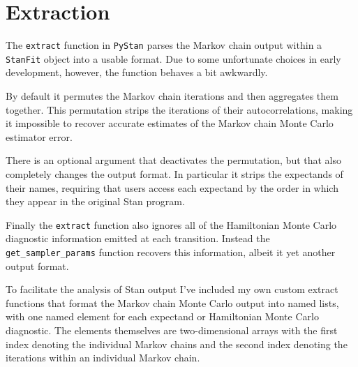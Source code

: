 \documentclass[
  letterpaper,
  DIV=11,
  numbers=noendperiod]{scrartcl}
\begin{document}
\hypertarget{extraction}{%
\section{Extraction}\label{extraction}}

The \texttt{extract} function in \texttt{PyStan} parses the Markov chain
output within a \texttt{StanFit} object into a usable format. Due to
some unfortunate choices in early development, however, the function
behaves a bit awkwardly.

By default it permutes the Markov chain iterations and then aggregates
them together. This permutation strips the iterations of their
autocorrelations, making it impossible to recover accurate estimates of
the Markov chain Monte Carlo estimator error.

There is an optional argument that deactivates the permutation, but that
also completely changes the output format. In particular it strips the
expectands of their names, requiring that users access each expectand by
the order in which they appear in the original Stan program.

Finally the \texttt{extract} function also ignores all of the
Hamiltonian Monte Carlo diagnostic information emitted at each
transition. Instead the \texttt{get\_sampler\_params} function recovers
this information, albeit it yet another output format.

To facilitate the analysis of Stan output I've included my own custom
extract functions that format the Markov chain Monte Carlo output into
named lists, with one named element for each expectand or Hamiltonian
Monte Carlo diagnostic. The elements themselves are two-dimensional
arrays with the first index denoting the individual Markov chains and
the second index denoting the iterations within an individual Markov
chain.
\end{document}
